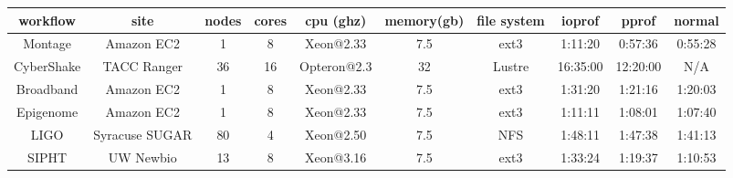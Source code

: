 \begin{table}[htb]
    \centering
    \begin{tabular}{@{}cccccccccc@{}}
        \toprule
        workflow &  site &  nodes &  cores &  cpu (ghz) &  memory(gb) &  file system &  ioprof &  pprof &  normal \\
        \midrule
        Montage &  Amazon EC2 &  1 &  8 &  Xeon@2.33 &  7.5 &  ext3 &  1:11:20 &  0:57:36 &  0:55:28 \\
        CyberShake &  TACC Ranger &  36 &  16 &  Opteron@2.3 &  32 &  Lustre &  16:35:00 &  12:20:00 & N/A \\
        Broadband &  Amazon EC2 & 1 & 8 & Xeon@2.33 &  7.5 &  ext3 &  1:31:20 &  1:21:16 &  1:20:03 \\
        Epigenome &  Amazon EC2 & 1 & 8 & Xeon@2.33 &  7.5 &  ext3 &  1:11:11 &  1:08:01 &  1:07:40 \\
        LIGO &  Syracuse SUGAR & 80 & 4 & Xeon@2.50 &  7.5 &  NFS &  1:48:11 &  1:47:38 &  1:41:13 \\
        SIPHT &  UW Newbio &  13 & 8 & Xeon@3.16 &  7.5 &  ext3 &  1:33:24 &  1:19:37 &  1:10:53 \\
        \bottomrule
    \end{tabular}
\end{table}
